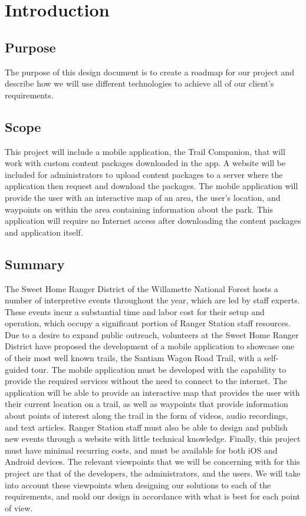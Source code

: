 \documentclass[letterpaper, 10pt,titlepage]{article}
\begin{document}
\tableofcontents
\newpage



\section{Introduction}
\subsection{Purpose}
The purpose of this design document is to create a roadmap for our project and describe how we will use different technologies to achieve all of our client’s requirements.

\subsection{Scope}
This project will include a mobile application, the Trail Companion, that will work with custom content packages downloaded in the app. A website will be included for administrators to upload content packages to a server where the application then request and download the packages. The mobile application will provide the user with an interactive map of an area, the user’s location, and waypoints on within the area containing information about the park. This application will require no Internet access after downloading the content packages and application itself.
                                       
                                       
\subsection{Summary}
The Sweet Home Ranger District of the Willamette National Forest hosts a number of interpretive events throughout the year, which are led by staff experts. These events incur a substantial time and labor cost for their setup and operation, which occupy a significant portion of Ranger Station staff resources. Due to a desire to expand public outreach, volunteers at the Sweet Home Ranger District have proposed the development of a mobile application to showcase one of their most well known trails, the Santiam Wagon Road Trail, with a self-guided tour. The mobile application must be developed with the capability to provide the required services without the need to connect to the internet. The application will be able to provide an interactive map that provides the user with their current location on a trail, as well as waypoints that provide information about points of interest along the trail in the form of videos, audio recordings, and text articles. Ranger Station staff must also be able to design and publish new events through a website with little technical knowledge. Finally, this project must have minimal recurring costs, and must be available for both iOS and Android devices. The relevant viewpoints that we will be concerning with for this project are that of the developers, the administrators, and the users. We will take into account these viewpoints when designing our solutions to each of the requirements, and mold our design in accordance with what is best for each point of view.
\end{document}
